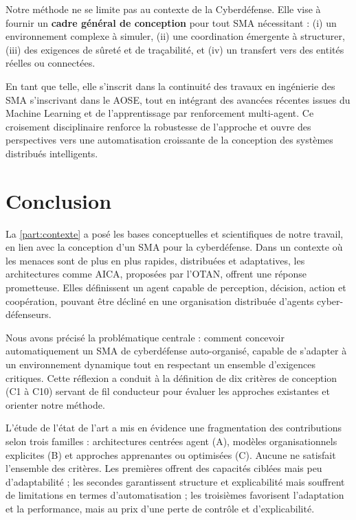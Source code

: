 Notre méthode ne se limite pas au contexte de la Cyberdéfense. Elle vise à fournir un \textbf{cadre général de conception} pour tout SMA nécessitant : (i) un environnement complexe à simuler, (ii) une coordination émergente à structurer, (iii) des exigences de sûreté et de traçabilité, et (iv) un transfert vers des entités réelles ou connectées.

En tant que telle, elle s'inscrit dans la continuité des travaux en ingénierie des \ac{SMA} s'inscrivant dans le \ac{AOSE}, tout en intégrant des avancées récentes issues du Machine Learning et de l'apprentissage par renforcement multi-agent. Ce croisement disciplinaire renforce la robustesse de l'approche et ouvre des perspectives vers une automatisation croissante de la conception des systèmes distribués intelligents.


\chapter*{Conclusion}

La \autoref{part:contexte} a posé les bases conceptuelles et scientifiques de notre travail, en lien avec la conception d'un \ac{SMA} pour la cyberdéfense. Dans un contexte où les menaces sont de plus en plus rapides, distribuées et adaptatives, les architectures comme \ac{AICA}, proposées par l'\ac{OTAN}, offrent une réponse prometteuse. Elles définissent un agent capable de perception, décision, action et coopération, pouvant être décliné en une organisation distribuée d'agents cyber-défenseurs.

Nous avons précisé la problématique centrale : comment concevoir automatiquement un \ac{SMA} de cyberdéfense auto-organisé, capable de s'adapter à un environnement dynamique tout en respectant un ensemble d'exigences critiques. Cette réflexion a conduit à la définition de dix critères de conception (C1 à C10) servant de fil conducteur pour évaluer les approches existantes et orienter notre méthode.

L'étude de l'état de l'art a mis en évidence une fragmentation des contributions selon trois familles : architectures centrées agent (A), modèles organisationnels explicites (B) et approches apprenantes ou optimisées (C). Aucune ne satisfait l'ensemble des critères. Les premières offrent des capacités ciblées mais peu d'adaptabilité ; les secondes garantissent structure et explicabilité mais souffrent de limitations en termes d'automatisation ; les troisièmes favorisent l'adaptation et la performance, mais au prix d'une perte de contrôle et d'explicabilité.

